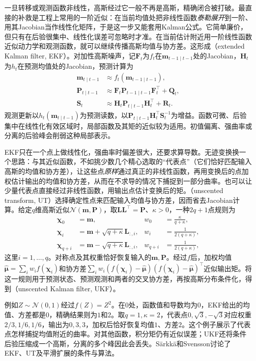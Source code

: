 一旦转移或观测函数非线性，高斯经过它一般不再是高斯，精确闭合被打破。最直接的补救是工程上常用的一阶近似：在当前均值处把非线性函数\emph{泰勒展开}到一阶、用其Jacobian当作线性化矩阵，于是这一步又能套用Kalman公式。它简单廉价，但只有在后验很集中、线性化误差可忽略时才准。在当前估计附近用一阶线性函数近似动力学和观测函数，就可以继续传播高斯均值与协方差。这形成（extended Kalman filter, EKF）。对加性高斯噪声，记$\bm F_t$为$f_t$在$\bm m_{t-1\mid t-1}$处的Jacobian，$\bm H_t$为$h_t$在预测均值处的Jacobian，预测计算为
\[
  \begin{aligned}
    \bm m_{t\mid t-1}&\approx f_t(\bm m_{t-1\mid t-1}),\\
    \bm P_{t\mid t-1}
      &\approx\bm F_t\bm P_{t-1\mid t-1}\bm F_t^\top+\bm Q_t,\\
    \bm S_t&\approx\bm H_t\bm P_{t\mid t-1}\bm H_t^\top+\bm R_t.
  \end{aligned}
\]
观测更新以$h_t(\bm m_{t\mid t-1})$为预测读数，以$\bm P_{t\mid t-1}\bm H_t^\top\bm S_t^{-1}$为增益。函数可微、后验集中在线性化有效区域时，局部函数及其矩的近似较为适用。初值偏离、强曲率或分离的后验峰会削弱这种局部表示。

EKF只在一个点上做线性化，强曲率时偏差很大，还要求算导数。无迹变换换一个思路：与其近似函数，不如挑少数几个精心选取的“代表点”（它们恰好匹配输入高斯的均值和协方差），让这些点\emph{原样}通过真正的非线性函数，再用变换后的点加权估计输出的均值和协方差，从而在不求导的情况下捕捉到一部分曲率。也可以让少量代表点直接经过非线性函数，用输出点估计变换后的矩。（unscented transform, UT）选择确定性点来匹配输入均值与协方差，因而省去Jacobian计算。给定$q$维高斯近似$\mathcal N(\bm m,\bm P)$，取$\bm L\bm L^\top=\bm P$、$\kappa>0$，一种$2q+1$点规则为
\[
  \begin{aligned}
    \bm\chi_0&=\bm m,&w_0&=\frac{\kappa}{q+\kappa},\\
    \bm\chi_i&=\bm m+\sqrt{q+\kappa}\bm L_{:,i},
      &w_i&=\frac{1}{2(q+\kappa)},\\
    \bm\chi_{q+i}&=\bm m-\sqrt{q+\kappa}\bm L_{:,i},
      &w_{q+i}&=\frac{1}{2(q+\kappa)},
  \end{aligned}
\]
这里$i=1,\ldots,q$。对称点及其权重恰好恢复输入的$\bm m,\bm P$。经过$f$后，加权均值$\widehat{\bm\mu}=\sum_iw_i f(\bm\chi_i)$和协方差$\sum_iw_i(f(\bm\chi_i)-\widehat{\bm\mu})(f(\bm\chi_i)-\widehat{\bm\mu})^\top$近似输出矩。将这一规则用于预测状态、预测观测和两者的交叉协方差，再按高斯分布条件化，得到（unscented Kalman filter, UKF）。

例如$Z\sim\mathcal N(0,1)$经过$f(Z)=Z^2$。在$0$处，函数值和导数均为$0$，EKF给出的均值、方差都是$0$，精确结果则为$1$和$2$。取$q=1,\kappa=2$，代表点$0,\sqrt3,-\sqrt3$对应权重$2/3,1/6,1/6$，输出为$0,3,3$，加权后恰好恢复均值$1$、方差$2$。这个例子展示了代表点怎样捕捉均值附近的曲率。对其他函数，积分矩仍有近似误差；UKF还将条件后验压缩成一个高斯，分离的多个峰因此会丢失。Särkkä和Svensson讨论了EKF、UT及平滑扩展的条件与算法。

